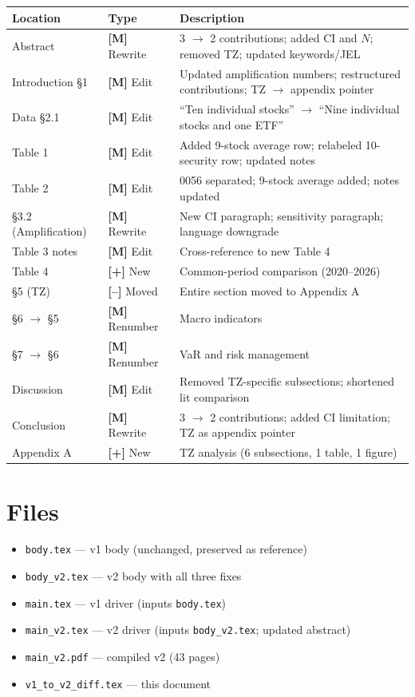 \documentclass[12pt,a4paper]{article}
\newcommand{\ADD}[1]{\textcolor{addgreen}{\textbf{[+]} #1}}
\newcommand{\DEL}[1]{\textcolor{delred}{\textbf{[--]} #1}}
\newcommand{\MOD}[1]{\textcolor{modblue}{\textbf{[M]} #1}}
\begin{document}
\begin{longtable}{p{3.5cm}p{2cm}p{7.5cm}}
\toprule
Location & Type & Description \\
\midrule
\endhead
Abstract & \MOD{Rewrite} & 3 $\to$ 2 contributions; added CI and $N$; removed TZ; updated keywords/JEL \\
\addlinespace
Introduction \S1 & \MOD{Edit} & Updated amplification numbers; restructured contributions; TZ $\to$ appendix pointer \\
\addlinespace
Data \S2.1 & \MOD{Edit} & ``Ten individual stocks'' $\to$ ``Nine individual stocks and one ETF'' \\
\addlinespace
Table 1 & \MOD{Edit} & Added 9-stock average row; relabeled 10-security row; updated notes \\
\addlinespace
Table 2 & \MOD{Edit} & 0056 separated; 9-stock average added; notes updated \\
\addlinespace
\S3.2 (Amplification) & \MOD{Rewrite} & New CI paragraph; sensitivity paragraph; language downgrade \\
\addlinespace
Table 3 notes & \MOD{Edit} & Cross-reference to new Table 4 \\
\addlinespace
Table 4 & \ADD{New} & Common-period comparison (2020--2026) \\
\addlinespace
\S5 (TZ) & \DEL{Moved} & Entire section moved to Appendix A \\
\addlinespace
\S6 $\to$ \S5 & \MOD{Renumber} & Macro indicators \\
\addlinespace
\S7 $\to$ \S6 & \MOD{Renumber} & VaR and risk management \\
\addlinespace
Discussion & \MOD{Edit} & Removed TZ-specific subsections; shortened lit comparison \\
\addlinespace
Conclusion & \MOD{Rewrite} & 3 $\to$ 2 contributions; added CI limitation; TZ as appendix pointer \\
\addlinespace
Appendix A & \ADD{New} & TZ analysis (6 subsections, 1 table, 1 figure) \\
\bottomrule
\end{longtable}

\section{Files}

\begin{itemize}
\item \texttt{body.tex} --- v1 body (unchanged, preserved as reference)
\item \texttt{body\_v2.tex} --- v2 body with all three fixes
\item \texttt{main.tex} --- v1 driver (inputs \texttt{body.tex})
\item \texttt{main\_v2.tex} --- v2 driver (inputs \texttt{body\_v2.tex}; updated abstract)
\item \texttt{main\_v2.pdf} --- compiled v2 (43 pages)
\item \texttt{v1\_to\_v2\_diff.tex} --- this document
\end{itemize}
\end{document}
